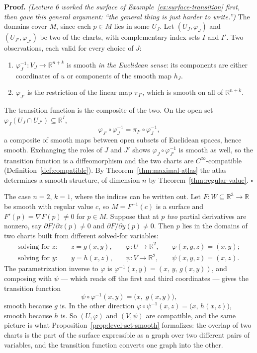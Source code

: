 \documentclass[11pt]{report}
\makeatletter
\newcounter{excounter}[section]
\renewenvironment{proof}[1][Proof]{\noindent\textbf{#1.} }{\hfill$\square$\par\vspace{5pt}}
\newcommand{\exlabel}[1]{\edef\@currentlabel{\arabic{section}.\arabic{excounter}}\label{#1}}
\makeatother
\begin{document}
\begin{proof}
\textit{(Lecture 6 worked the surface of Example~\ref{ex:surface-transition} first, then gave this general argument: ``the general thing is just harder to write.'')} The domains cover $M$, since each $p \in M$ lies in some $U_J$. Let $(U_J, \varphi_J)$ and $(U_{J'}, \varphi_{J'})$ be two of the charts, with complementary index sets $I$ and $I'$. Two observations, each valid for every choice of $J$:
\begin{enumerate}
    \item $\varphi_J^{-1} : V_J \to \mathbb{R}^{n+k}$ is smooth \emph{in the Euclidean sense}: its components are either coordinates of $u$ or components of the smooth map $h_J$.
    \item $\varphi_{J'}$ is the restriction of the linear map $\pi_{I'}$, which is smooth on all of $\mathbb{R}^{n+k}$.
\end{enumerate}
The transition function is the composite of the two. On the open set $\varphi_J(U_J \cap U_{J'}) \subseteq \mathbb{R}^I$,
\[
\varphi_{J'} \circ \varphi_J^{-1} = \pi_{I'} \circ \varphi_J^{-1},
\]
a composite of smooth maps between open subsets of Euclidean spaces, hence smooth. Exchanging the roles of $J$ and $J'$ shows $\varphi_J \circ \varphi_{J'}^{-1}$ is smooth as well, so the transition function is a diffeomorphism and the two charts are $C^\infty$-compatible (Definition~\ref{def:compatible}). By Theorem~\ref{thm:maximal-atlas} the atlas determines a smooth structure, of dimension $n$ by Theorem~\ref{thm:regular-value}.
\end{proof}
\begin{exbox}\exlabel{ex:surface-transition}
The case $n = 2$, $k = 1$, where the indices can be written out. Let $F : W \subseteq \mathbb{R}^3 \to \mathbb{R}$ be smooth with regular value $c$, so $M = F^{-1}(c)$ is a surface and $F'(p) = \nabla F(p) \neq 0$ for $p \in M$. Suppose that at $p$ \emph{two} partial derivatives are nonzero, say $\partial F/\partial z(p) \neq 0$ and $\partial F/\partial y(p) \neq 0$. Then $p$ lies in the domains of two charts built from different solved-for variables:
\[
\begin{aligned}
\text{solving for } z: &\quad z = g(x,y), &\quad \varphi : U \to \mathbb{R}^2, &\quad \varphi(x,y,z) = (x,y);\\
\text{solving for } y: &\quad y = h(x,z), &\quad \psi : V \to \mathbb{R}^2, &\quad \psi(x,y,z) = (x,z).
\end{aligned}
\]
The parametrization inverse to $\varphi$ is $\varphi^{-1}(x,y) = (x,\,y,\,g(x,y))$, and composing with $\psi$ --- which reads off the first and third coordinates --- gives the transition function
\[
\psi \circ \varphi^{-1}(x,y) = \big(x,\; g(x,y)\big),
\]
smooth because $g$ is. In the other direction $\varphi \circ \psi^{-1}(x,z) = \big(x,\, h(x,z)\big)$, smooth because $h$ is. So $(U,\varphi)$ and $(V,\psi)$ are compatible, and the same picture is what Proposition~\ref{prop:level-set-smooth} formalizes: the overlap of two charts is the part of the surface expressible as a graph over two different pairs of variables, and the transition function converts one graph into the other.
\end{exbox}
\end{document}
